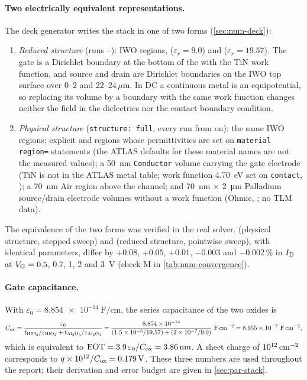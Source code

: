 \paragraph{Two electrically equivalent representations.} The deck generator \protect{}
writes the stack in one of two forms (\cref{sec:num-deck}):
\begin{enumerate}
  \item \emph{Reduced structure} (runs --): IWO regions, \AlO{} ($\varepsilon_r = 9.0$) and \HfO{}
        ($\varepsilon_r = 19.57$). The gate is a Dirichlet boundary at the bottom of the \HfO{} with the TiN work
        function, and source and drain are Dirichlet boundaries on the IWO top surface over $0$--$2$ and
        $22$--$24$\,$\mu$m. In DC a continuous metal is an equipotential, so replacing its volume by a boundary with the
        same work function changes neither the field in the dielectrics nor the contact boundary condition.
  \item \emph{Physical structure} (\texttt{structure: full}, every run from  on): the same IWO regions;
        explicit \AlO{} and \HfO{} regions whose permittivities are set on \texttt{material region=} statements
        (the ATLAS defaults for these material names are not the measured values); a \SI{50}{nm}
        \texttt{Conductor} volume carrying the gate electrode (TiN is not in the ATLAS metal table; work function
        \SI{4.70}{eV} set on \texttt{contact}, ); a \SI{70}{nm} Air region above the channel; and
        \SI{70}{nm} $\times$ \SI{2}{\micro\metre} Palladium source/drain electrode volumes without a work function
        (Ohmic, ; no TLM data).
\end{enumerate}
The equivalence of the two forms was verified in the real solver.  (physical structure, stepped sweep) and
 (reduced structure, pointwise sweep), with identical parameters, differ by $+0.08$, $+0.05$, $+0.01$,
$-0.003$ and $-0.002$\,\% in $I_{\mathrm{D}}$ at $V_{\mathrm{G}} = 0.5$, 0.7, 1, 2 and \SI{3}{V} (check M in \cref{tab:num-convergence}).

\paragraph{Gate capacitance.} With $\varepsilon_0 = \SI{8.854e-14}{\farad\per\centi\metre}$, the series capacitance of
the two oxides is
\begin{equation}
  C_{\mathrm{ox}} = \frac{\varepsilon_0}{t_{\mathrm{HfO_2}}/\varepsilon_{\mathrm{HfO_2}} + t_{\mathrm{Al_2O_3}}/\varepsilon_{\mathrm{Al_2O_3}}}
       = \frac{8.854\times10^{-14}}{(1.5\times10^{-6}/19.57) + (2\times10^{-7}/9.0)}\ \mathrm{F\,cm^{-2}}
       = 8.955\times10^{-7}\ \mathrm{F\,cm^{-2}},
  \label{eq:inp-cox}
\end{equation}
which is equivalent to $\mathrm{EOT} = 3.9\,\varepsilon_0/C_{\mathrm{ox}} = \SI{3.86}{nm}$. A sheet charge of $10^{12}\,\mathrm{cm}^{-2}$ corresponds to
$q\times10^{12}/C_{\mathrm{ox}} = \SI{0.179}{V}$. These three numbers are used throughout the report; their derivation and error
budget are given in \cref{sec:par-stack}.


